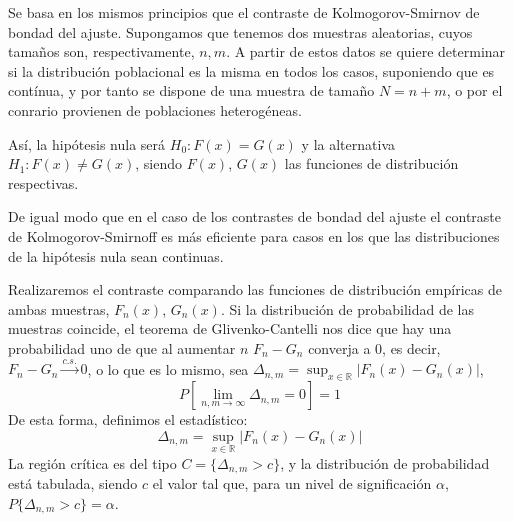 Se basa en los mismos principios que el contraste de Kolmogorov-Smirnov de bondad del ajuste. Supongamos que tenemos dos muestras aleatorias, cuyos tama\~nos son, respectivamente, $n, m$. A partir de estos datos se quiere determinar si la distribuci\'on poblacional es la misma en todos los casos, suponiendo que es cont\'inua, y por tanto se dispone de una muestra de tama\~no $N=n+m$, o por el conrario provienen de poblaciones heterog\'eneas.

As\'i, la hip\'otesis nula ser\'a $H_0:F(x)=G(x)$ y la alternativa $H_1:F(x)\neq G(x)$, siendo $F(x)$, $G(x)$ las funciones de distribuci\'on respectivas.

De igual modo que en el caso de los contrastes de bondad del ajuste el contraste de Kolmogorov-Smirnoff es m\'as eficiente para casos en los que las distribuciones de la hip\'otesis nula sean continuas.

Realizaremos el contraste comparando las funciones de distribuci\'on emp\'iricas de ambas muestras, $F_n(x)$, $G_n(x)$. Si la distribuci\'on de probabilidad de las muestras coincide, el teorema de Glivenko-Cantelli nos dice que hay una probabilidad uno de que al aumentar $n$ $F_n-G_n$ converja a $0$, es decir, $F_n-G_n\overset{c.s.}{\to}0$, o lo que es lo mismo, sea $\Delta_{n,m}=\sup_{x\in\mathbb{R}}|F_n(x)-G_n(x)|$,
\[P\left[\lim_{n,m\to\infty}\Delta_{n,m}=0\right]=1\]
De esta forma, definimos el estad\'istico:
\[ \Delta_{n,m}=\sup_{x\in\mathbb{R}}|F_n(x)-G_n(x)| \]
La regi\'on cr\'itica es del tipo $C=\{\Delta_{n,m}>c\}$, y la distribuci\'on de probabilidad est\'a tabulada, siendo $c$ el valor tal que, para un nivel de significaci\'on $\alpha$, $P\{\Delta_{n,m}>c\}=\alpha$.
